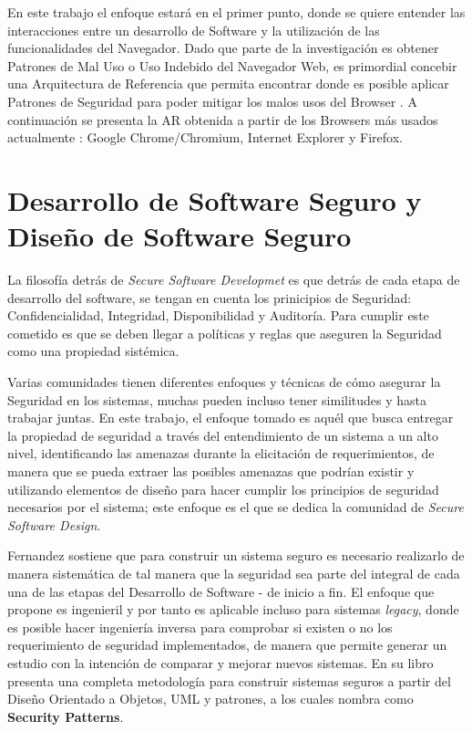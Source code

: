 En este trabajo el enfoque estará en el primer punto, donde se quiere entender las interacciones entre un desarrollo de Software y la utilización de las funcionalidades del Navegador. Dado que parte de la investigación es obtener Patrones de Mal Uso o Uso Indebido del Navegador Web, es primordial concebir una Arquitectura de Referencia que permita encontrar donde es posible aplicar Patrones de Seguridad para poder mitigar los malos usos del Browser \cite{Submitted2014}. A continuación se presenta la AR obtenida a partir de los Browsers más usados actualmente \cite{statBrow}: Google Chrome/Chromium, Internet Explorer y Firefox.

\section{Desarrollo de Software Seguro y Diseño de Software Seguro}
\label{chap2:SSD}

La filosofía detrás de \textit{Secure Software Developmet} es que detrás de cada etapa de desarrollo del software, se tengan en cuenta los prinicipios de Seguridad: Confidencialidad, Integridad, Disponibilidad y Auditoría. Para cumplir este cometido es que se deben llegar a políticas y reglas que aseguren la Seguridad como una propiedad sistémica.

Varias comunidades tienen diferentes enfoques y técnicas de cómo asegurar la Seguridad en los sistemas, muchas pueden incluso tener similitudes y hasta trabajar juntas. En este trabajo, el enfoque tomado es aquél que busca entregar la propiedad de seguridad a través del entendimiento de un sistema a un alto nivel, identificando las amenazas durante la elicitación de requerimientos, de manera que se pueda extraer las posibles amenazas que podrían existir y utilizando elementos de diseño para hacer cumplir los principios de seguridad necesarios por el sistema; este enfoque es el que se dedica la comunidad de \textit{Secure Software Design}. 

Fernandez \cite{fernandez2013security} sostiene que para construir un sistema seguro es necesario realizarlo de manera sistemática de tal manera que la seguridad sea parte del integral de cada una de las etapas del Desarrollo de Software - de inicio a fin. El enfoque que propone es ingenieril y por tanto es aplicable incluso para sistemas \textit{legacy}, donde es posible hacer ingeniería inversa para comprobar si existen o no los requerimiento de seguridad implementados, de manera que permite generar un estudio con la intención de comparar y mejorar nuevos sistemas. En su libro \cite{fernandez2013security} presenta una completa metodología para construir sistemas seguros a partir del Diseño Orientado a Objetos, UML y patrones, a los cuales nombra como \textbf{Security Patterns}.

